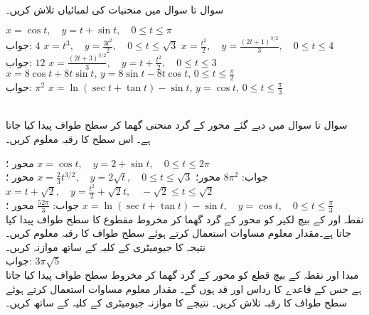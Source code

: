 \\
سوال  تا سوال  میں منحنیات کی لمبائیاں تلاش کریں۔

$x=\cos t,\quad y=t+\sin t,\quad 0\le t\le \pi$\\
جواب:\quad
$4$
$x=t^3,\quad y=\frac{3t^2}{2},\quad 0\le t\le \sqrt{3}$
$x=\frac{t^2}{2},\quad y=\frac{(2t+1)^{3/2}}{3},\quad 0\le t\le 4$\\
جواب:\quad
$12$
$x=\frac{(2t+3)^{3/2}}{3},\quad y=t+\frac{t^2}{2},\quad 0\le t\le 3$
$x=8\cos t+8t\sin t,\, y=8\sin t-8t\cos t,\, 0\le t\le \frac{\pi}{2}$\\
جواب:\quad
$\pi^2$
$x=\ln(\sec t+\tan t)-\sin t,\, y=\cos t,\, 0\le t\le \frac{\pi}{3}$

\\
سوال  تا سوال  میں دیے گئے محور کے گرد منحنی گھما کر سطح طواف پیدا کیا جاتا ہے۔ اس سطح کا رقبہ معلوم کریں۔

محور ؛ \quad
$x=\cos t,\quad y=2+\sin t,\quad 0\le t\le 2\pi$\\
جواب:\quad
$8\pi^2$
محور؛ \quad
$x=\frac{2}{3}t^{3/2},\quad y=2\sqrt{t},\quad 0\le t\le \sqrt{3}$
محور ؛ \quad
$x=t+\sqrt{2},\quad y=\frac{t^2}{2}+\sqrt{2}t,\quad -\sqrt{2}\le t\le \sqrt{2}$\\
جواب:\quad
$\tfrac{52\pi}{3}$
محور ؛ \quad
$x=\ln(\sec t+\tan t)-\sin t,\quad y=\cos t,\quad 0\le t\le \frac{\pi}{3}$
\\
نقطہ  اور  کے بیچ لکیر کو محور  کے گرد گھما کر مخروط مقطوع کا سطح طواف پیدا کیا جاتا ہے۔مقدار معلوم مساوات  استعمال کرتے ہوئے سطح طواف کا رقبہ معلوم کریں۔ نتیجہ کا جیومیٹری کے کلیہ  کے ساتھ موازنہ کریں۔\\
جواب:\quad
$3\pi\sqrt{5}$
\\
مبدا اور نقطہ  کے بیچ قطع کو محور  کے گرد گھما کر مخروط سطح طواف پیدا کیا جاتا ہے جس کے قاعدے کا رداس  اور  قد  ہوں گے۔ مقدار معلوم مساوات  استعمال کرتے ہوئے سطح طواف کا رقبہ تلاش کریں۔  نتیجے کا موازنہ جیومیٹری کے کلیہ  کے ساتھ کریں۔

